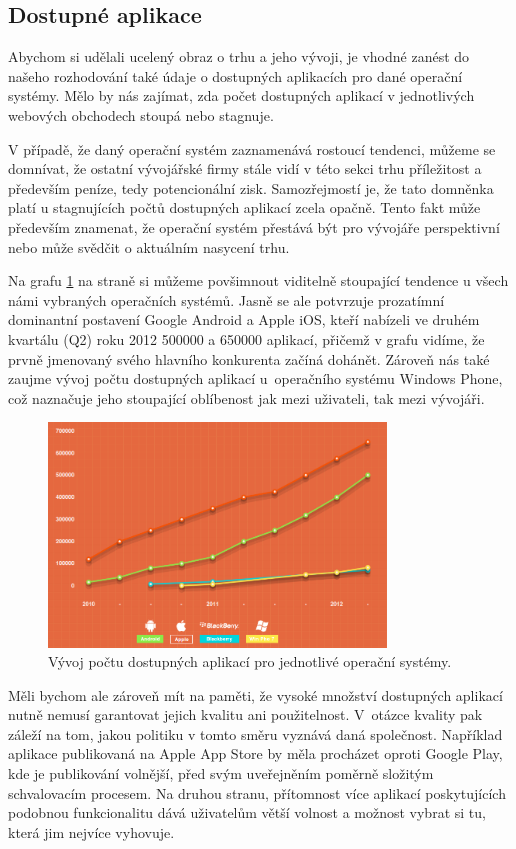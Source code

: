 \documentclass[thesis=M,czech]{FITthesis}[2012/06/26]
\begin{document}
\subsection{Dostupné aplikace}
Abychom si udělali ucelený obraz o trhu a jeho vývoji, je vhodné zanést do našeho rozhodování také údaje o dostupných aplikacích pro dané operační systémy. Mělo by nás zajímat, zda počet dostupných aplikací v jednotlivých webových obchodech stoupá nebo stagnuje.

V případě, že daný operační systém zaznamenává rostoucí tendenci, můžeme se domnívat, že ostatní vývojářské firmy stále vidí v této sekci trhu příležitost a především peníze, tedy potencionální zisk. Samozřejmostí je, že tato domněnka platí u stagnujících počtů dostupných aplikací zcela opačně. Tento fakt může především znamenat, že operační systém přestává být pro vývojáře perspektivní nebo může svědčit o aktuálním nasycení trhu.

Na grafu \ref{fig:apps} na straně \pageref{fig:apps} si můžeme povšimnout viditelně stoupající tendence u všech námi vybraných operačních systémů. Jasně se ale potvrzuje prozatímní dominantní postavení Google Android a Apple iOS, kteří nabízeli ve druhém kvartálu (Q2) roku 2012 500000 a 650000 aplikací, přičemž v grafu vidíme, že prvně jmenovaný svého hlavního konkurenta začíná dohánět. Zároveň nás také zaujme vývoj počtu dostupných aplikací u~operačního systému Windows Phone, což naznačuje jeho stoupající oblíbenost jak mezi uživateli, tak mezi vývojáři.

\begin{figure}\centering
	\includegraphics[width=0.8\textwidth]{figures/apps_available}
	\caption{Vývoj počtu dostupných aplikací pro jednotlivé operační systémy.\cite{mobile_stats}}
	\label{fig:apps}
\end{figure}

Měli bychom ale zároveň mít na paměti, že vysoké množství dostupných aplikací nutně nemusí garantovat jejich kvalitu ani použitelnost. V~otázce kvality pak záleží na tom, jakou politiku v tomto směru vyznává daná společnost. Například aplikace publikovaná na Apple App Store by měla procházet oproti Google Play, kde je publikování volnější, před svým uveřejněním poměrně složitým schvalovacím procesem. Na druhou stranu, přítomnost více aplikací poskytujících podobnou funkcionalitu dává uživatelům větší volnost a možnost vybrat si tu, která jim nejvíce vyhovuje.
\end{document}
